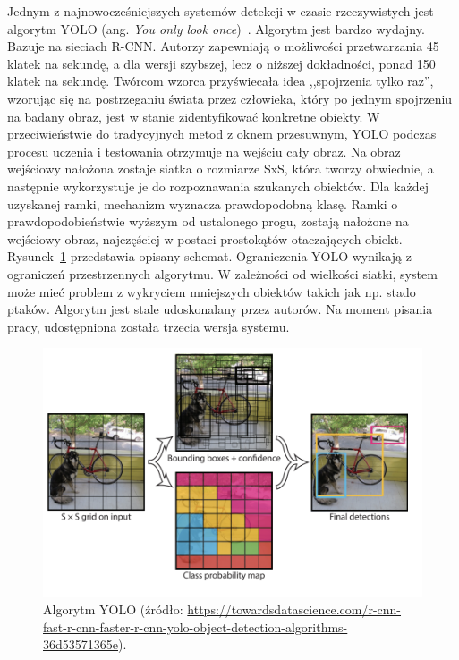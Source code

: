 Jednym z najnowocześniejszych systemów detekcji w czasie rzeczywistych jest algorytm YOLO (ang. \textit{You only look once})~\cite{7780460}.
Algorytm jest bardzo wydajny.
Bazuje na sieciach R-CNN.
Autorzy zapewniają o możliwości przetwarzania 45 klatek na sekundę, a dla wersji szybszej, lecz o niższej dokładności, ponad 150 klatek na sekundę.
Twórcom wzorca przyświecała idea ,,spojrzenia tylko raz'', wzorując się na postrzeganiu świata przez człowieka, który po jednym spojrzeniu na badany obraz, jest w stanie zidentyfikować konkretne obiekty.
W przeciwieństwie do tradycyjnych metod z oknem przesuwnym, YOLO podczas procesu uczenia i testowania otrzymuje na wejściu cały obraz.
Na obraz wejściowy nałożona zostaje siatka o rozmiarze SxS, która tworzy obwiednie, a następnie wykorzystuje je do rozpoznawania szukanych obiektów.
Dla każdej uzyskanej ramki, mechanizm wyznacza prawdopodobną klasę.
Ramki o prawdopodobieństwie wyższym od ustalonego progu, zostają nałożone na wejściowy obraz, najczęściej w postaci prostokątów otaczających obiekt.
Rysunek~\ref{fig:yolo} przedstawia opisany schemat.
Ograniczenia YOLO wynikają z ograniczeń przestrzennych algorytmu.
W zależności od wielkości siatki, system może mieć problem z wykryciem mniejszych obiektów takich jak np. stado ptaków.
Algorytm jest stale udoskonalany przez autorów.
Na moment pisania pracy, udostępniona została trzecia wersja systemu.
\begin{figure}[!ht]
    \centering
    \includegraphics[scale=0.4]{Pictures/yolo}
    \caption{Algorytm YOLO (źródło: \url{https://towardsdatascience.com/r-cnn-fast-r-cnn-faster-r-cnn-yolo-object-detection-algorithms-36d53571365e}).}
    \label{fig:yolo}
\end{figure}
\FloatBarrier


